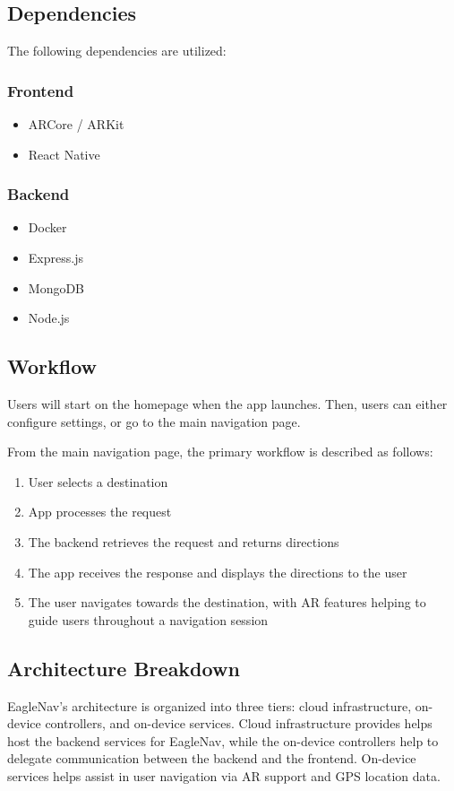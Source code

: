 \documentclass{article}
\begin{document}
\subsection{Dependencies}
The following dependencies are utilized:

\subsubsection{Frontend}
\begin{itemize}
\item{ARCore / ARKit}
\item{React Native}
\end{itemize}

\subsubsection{Backend}
\begin{itemize}
\item{Docker}
\item{Express.js}
\item{MongoDB}
\item{Node.js}
\end{itemize}


\subsection{Workflow}
Users will start on the homepage when the app launches. Then, users can either configure settings, or go to the main navigation page.

\vspace{3pt}
\hspace{-14pt}From the main navigation page, the primary workflow is described as follows:

\begin{enumerate}
\item{User selects a destination}
\item{App processes the request}
\item{The backend retrieves the request and returns directions}
\item{The app receives the response and displays the directions to the user}
\item{The user navigates towards the destination, with AR features helping to guide users throughout a navigation session}
\end{enumerate}


\subsection{Architecture Breakdown}
EagleNav's architecture is organized into three tiers: cloud infrastructure, on-device controllers, and on-device services. Cloud infrastructure provides helps host the backend services for EagleNav, while the on-device controllers help to delegate communication between the backend and the frontend. On-device services helps assist in user navigation via AR support and GPS location data.
\end{document}
